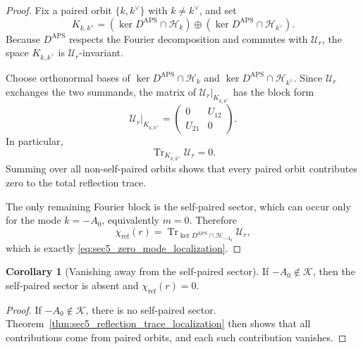 \documentclass[11pt]{article}
\theoremstyle{definition}
\newtheorem{corollary}[theorem]{Corollary}
\DeclareMathOperator{\APS}{APS}
\numberwithin{equation}{section}
\DeclareMathOperator{\Tr}{Tr}
\begin{document}
\begin{proof}
Fix a paired orbit \(\{k,k^\vee\}\) with \(k\neq k^\vee\), and set
\begin{equation}\label{eq:sec5_paired_harmonic_space}
K_{k,k^\vee}
=
(\ker D^{\APS}\cap \mathcal H_k)
\oplus
(\ker D^{\APS}\cap \mathcal H_{k^\vee}).
\end{equation}
Because \(D^{\APS}\) respects the Fourier decomposition and commutes with \(\mathcal U_r\), the space \(K_{k,k^\vee}\) is \(\mathcal U_r\)-invariant.

Choose orthonormal bases of \(\ker D^{\APS}\cap\mathcal H_k\) and \(\ker D^{\APS}\cap\mathcal H_{k^\vee}\). Since \(\mathcal U_r\) exchanges the two summands, the matrix of \(\mathcal U_r|_{K_{k,k^\vee}}\) has the block form
\begin{equation}\label{eq:sec5_offdiagonal_matrix}
\mathcal U_r\big|_{K_{k,k^\vee}}
=
\begin{pmatrix}
0 & U_{12}\\
U_{21} & 0
\end{pmatrix}.
\end{equation}
In particular,
\begin{equation}\label{eq:sec5_paired_trace_zero}
\Tr_{K_{k,k^\vee}} \mathcal U_r= 0.
\end{equation}
Summing over all non-self-paired orbits shows that every paired orbit contributes zero to the total reflection trace.

The only remaining Fourier block is the self-paired sector, which can occur only for the mode \(k=-A_0\), equivalently \(m=0\). Therefore
\begin{equation}
\chi_{\text{ref}}(r)
= \Tr_{\ker D^{\APS}\cap \mathcal H_{-A_0}} \mathcal U_r,
\end{equation}
which is exactly \eqref{eq:sec5_zero_mode_localization}.
\end{proof}

\begin{corollary}[Vanishing away from the self-paired sector]
\label{cor:sec5_trace_vanishes_without_zero_mode}
If \(-A_0\notin\mathcal K\), then the self-paired sector is absent and \(\chi_{\text{ref}}(r)=0\).
\end{corollary}

\begin{proof}
If \(-A_0\notin\mathcal K\), there is no self-paired sector. Theorem~\ref{thm:sec5_reflection_trace_localization} then shows that all contributions come from paired orbits, and each such contribution vanishes.
\end{proof}
\end{document}
